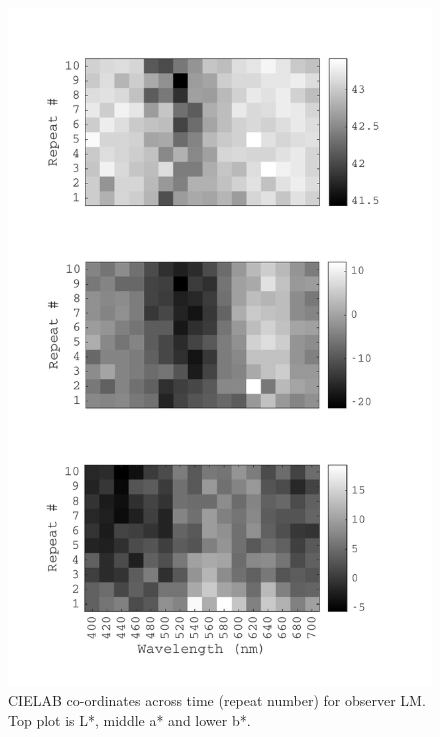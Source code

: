 \begin{figure}[htbp]
\includegraphics[max width=1.2\textwidth, center]{figs/LargeSphere/LMdataOverTime.pdf}
\caption{CIELAB co-ordinates across time (repeat number) for observer LM. Top plot is L*, middle a* and lower b*.}
\label{fig:timeLM}
\end{figure}

